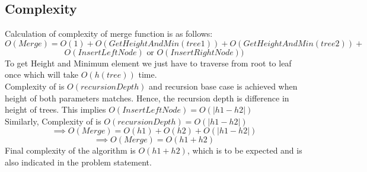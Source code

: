 \subsection{Complexity}
Calculation of complexity of merge function is as follows:
\vspace{5pt}
\\
$$O(Merge)=O(1) + O(GetHeightAndMin(tree1)) + O(GetHeightAndMin(tree2)) + $$
$$  O(InsertLeftNode)\text{ or }O(InsertRightNode))$$
To get Height and Minimum element we just have to traverse from root to leaf once which will take $O(h(tree))$ time. 
\vspace{5pt}
\\
Complexity of  is $O(recursionDepth)$ and recursion base case is achieved when height of both parameters matches. Hence, the recursion depth is difference in height of trees. This implies $O(InsertLeftNode) = O(|h1-h2|)$
\vspace{5pt}
\\
Similarly, Complexity of  is $O(recursionDepth)  = O(|h1-h2|)$
$$\implies O(Merge)= O(h1) + O(h2) + O(|h1-h2|)$$
$$\implies O(Merge)= O(h1 + h2)$$
Final complexity of the algorithm is $O(h1+h2)$, which is to be expected and is also indicated in the problem statement.
